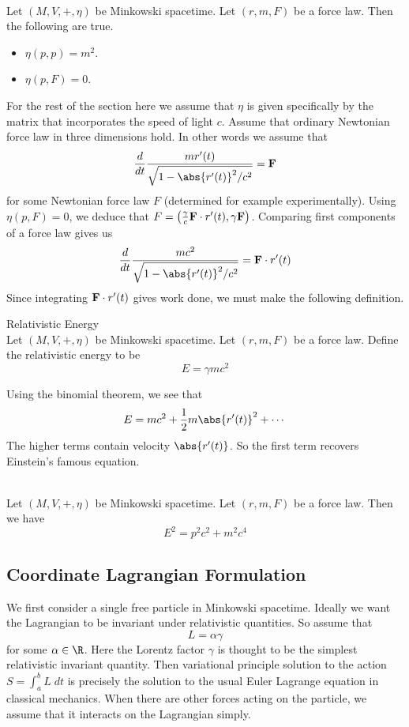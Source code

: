 \documentclass[a4paper]{article}
\begin{document}
\begin{prp}{}{}\\
Let $(M,V,+,\eta)$ be Minkowski spacetime. Let $(r,m,F)$ be a force law. Then the following are true. 
\begin{itemize}
\item $\eta(p,p)=m^2$. 
\item $\eta(p,F)=0$. 
\end{itemize}
\end{prp}

For the rest of the section here we assume that $\eta$ is given specifically by the matrix that incorporates the speed of light $c$. Assume that ordinary Newtonian force law in three dimensions hold. In other words we assume that $$\frac{d}{dt}\frac{mr'(t)}{\sqrt{1-\abs{r'(t)}^2/c^2}}=\bold{F}$$ for some Newtonian force law $F$ (determined for example experimentally). Using $\eta(p,F)=0$, we deduce that $F=\left(\frac{\gamma}{c}\bold{F}\cdot r'(t),\gamma\bold{F}\right)$. Comparing first components of a force law gives us $$\frac{d}{dt}\frac{mc^2}{\sqrt{1-\abs{r'(t)}^2/c^2}}=\bold{F}\cdot r'(t)$$ Since integrating $\bold{F}\cdot r'(t)$ gives work done, we must make the following definition. 

\begin{defn}{Relativistic Energy}{}\\
Let $(M,V,+,\eta)$ be Minkowski spacetime. Let $(r,m,F)$ be a force law. Define the relativistic energy to be $$E=\gamma mc^2$$
\end{defn}

Using the binomial theorem, we see that $$E=mc^2+\frac{1}{2}m\abs{r'(t)}^2+\cdots$$ The higher terms contain velocity $\abs{r'(t)}$. So the first term recovers Einstein's famous equation. 

\begin{prp}{}{}\\
Let $(M,V,+,\eta)$ be Minkowski spacetime. Let $(r,m,F)$ be a force law. Then we have $$E^2=p^2c^2+m^2c^4$$
\end{prp}

\subsection{Coordinate Lagrangian Formulation}
We first consider a single free particle in Minkowski spacetime. Ideally we want the Lagrangian to be invariant under relativistic quantities. So assume that $$L=\alpha\gamma$$ for some $\alpha\in\R$. Here the Lorentz factor $\gamma$ is thought to be the simplest relativistic invariant quantity. Then variational principle solution to the action $S=\int_a^b L\;dt$ is precisely the solution to the usual Euler Lagrange equation in classical mechanics. When there are other forces acting on the particle, we assume that it interacts on the Lagrangian simply. 
\end{document}

